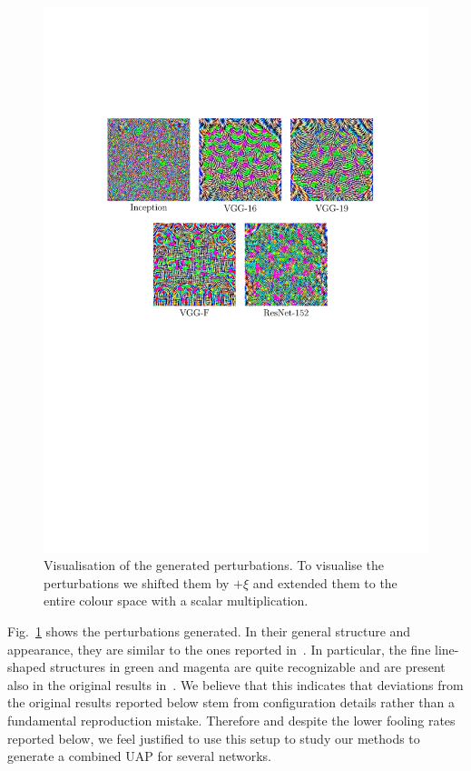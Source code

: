 \documentclass[runningheads]{llncs}
\begin{document}
\begin{figure}[ht]
	\centering
	\includegraphics[clip, trim=3.8cm 12.9cm 2.8cm 5.8cm, width=1.0\textwidth]{plots_generierung/perturbationsFigure.pdf}
	\caption{Visualisation of the generated perturbations. To visualise the perturbations we shifted them by $+\xi$ and extended them to the entire colour space with a scalar multiplication.}\label{fig_stoerwerte}
\end{figure}

Fig.~\ref{fig_stoerwerte} shows the perturbations generated. In their general structure and appearance, they are similar to the ones reported in~\cite{moosavidezfooli_universal_2017}. In particular, the fine line-shaped structures in green and magenta are quite recognizable and are present also in the original results in~\cite{moosavidezfooli_universal_2017}. We believe that this indicates that deviations from the original results reported below stem from configuration details rather than a fundamental reproduction mistake. Therefore and despite the lower fooling rates reported below, we feel justified to use this setup to study our methods to generate a combined UAP for several networks. 
\end{document}
